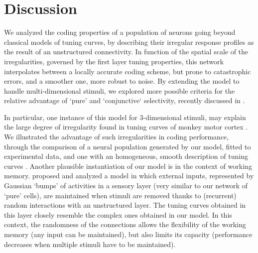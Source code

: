 \documentclass[a4paper]{article}%
\begin{document}
\section{Discussion}

We analyzed the coding properties of a population of neurons going beyond
classical models of tuning curves, by describing their irregular response
profiles as the result of an unstructured connectivity. In function of the
spatial scale of the irregularities, governed by the first layer tuning
properties, this network interpolates between a locally accurate coding
scheme, but prone to catastrophic errors, and a smoother one, more robust to
noise. By extending the model to handle multi-dimensional stimuli, we explored
more possible criteria for the relative advantage of `pure' and `conjunctive`
selectivity, recently discussed in
\cite{Finkelstein2018OptimalBats,Harel2020OptimalConstraints}.

In particular, one instance of this model for 3-dimensional stimuli, may
explain the large degree of irregularity found in tuning curves of monkey
motor cortex \cite{Lalazar2016TuningConnectivity}. We illustrated the
advantage of such irregularities in coding performance, through the comparison
of a neural population generated by our model, fitted to experimental data,
and one with an homogeneous, smooth description of tuning curves
\cite{Wang2007MotorReaching}. 
Another plausible instantiation of our model is in the context of working
memory. \cite{Bouchacourt2019AMemory} proposed and analyzed a model in which
external inputs, represented by Gaussian `bumps' of activities in a sensory
layer (very similar to our network of `pure' cells), are maintained when
stimuli are removed thanks to (recurrent) random interactions with an
unstructured layer. The tuning curves obtained in this layer closely resemble
the complex ones obtained in our model. In this context, the randomness of the
connections allows the flexibility of the working memory (any input can be
maintained), but also limits its capacity (performance decreases when multiple
stimuli have to be maintained).
\end{document}
